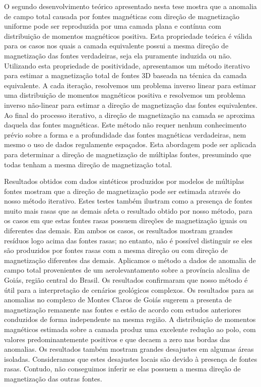 O segundo desenvolvimento teórico apresentado nesta tese mostra que a anomalia de campo total causada por fontes magnéticas com direção 
de magnetização uniforme pode ser reproduzida por uma camada plana e contínua com distribuição de momentos magnéticos positiva. 
Esta propriedade teórica é válida para os casos nos quais a camada equivalente possui a mesma direção de magnetização 
das fontes verdadeiras, seja ela puramente induzida ou não. 
Utilizando esta propriedade de positividade, apresentamos um método iterativo para estimar a magnetização total de fontes 
3D baseada na técnica da camada equivalente. A cada iteração, resolvemos um problema inverso linear para estimar uma distribuição 
de momentos magnéticos positiva e resolvemos um problema inverso não-linear para estimar a direção de magnetização das 
fontes equivalentes. Ao final do processo iterativo, a direção de magnetização na camada se aproxima daquela das 
fontes magnéticas. 
Este método não requer nenhum conhecimento prévio sobre a forma e a profundidade das fontes 
magnéticas verdadeiras, nem mesmo o uso de dados regulamente espaçados. Esta abordagem pode ser aplicada para determinar a direção 
de magnetização de múltiplas fontes, presumindo que todas tenham a mesma direção de magnetização total. 

Resultados obtidos com dados sintéticos produzidos por modelos de múltiplas fontes mostram que a direção de magnetização 
pode ser estimada através do nosso método iterativo. 
Estes testes também ilustram como a presença de fontes muito mais rasas que as demais afeta o resultado obtido por nosso 
método, para os casos em que estas fontes rasas possuem direções de magnetização iguais ou diferentes das demais. 
Em ambos os casos, os resultados mostram grandes resíduos logo acima das fontes rasas; no entanto, não é possível 
distinguir se eles são produzidos por fontes rasas com a mesma direção ou com direção de magnetização diferentes das demais. 
Aplicamos o método a dados de anomalia de campo total provenientes de um aerolevantamento sobre a província alcalina de Goiás, 
região central do Brasil. 
Os resultados confirmaram que nosso método é útil para a interpretação de cenários geológicos complexos. 
Os resultados para as anomalias no complexo de Montes Claros de Goiás sugerem a presenta de magnetização remanente nas fontes e 
estão de acordo com estudos anteriores conduzidos de forma independente na mesma região. 
A distribuição de momentos magnéticos estimada sobre a camada produz uma excelente redução ao polo, com valores predominantemente positivos
e que decaem a zero nas bordas das anomalias. 
Os resultados também mostram grandes desajustes em algumas áreas isoladas. 
Consideramos que estes desajustes locais são devido à presença de fontes rasas. Contudo, não conseguimos inferir se elas possuem a 
mesma direção de magnetização das outras fontes. 


